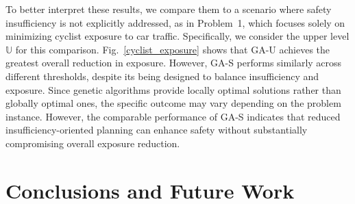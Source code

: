 \documentclass[letterpaper, 10 pt, conference]{ieeeconf}  %
\begin{document}
To better interpret these results, we compare them to a scenario where safety insufficiency is not explicitly addressed, as in Problem~1, which focuses solely on minimizing cyclist exposure to car traffic. Specifically, we consider the upper level $\mathbb{U}$ for this comparison. Fig.~\ref{cyclist_exposure} shows that \mbox{GA-U} achieves the greatest overall reduction in exposure. However, \mbox{GA-S} performs similarly across different thresholds, despite its being designed to balance insufficiency and exposure. Since genetic algorithms provide locally optimal solutions rather than globally optimal ones, the specific outcome may vary depending on the problem instance. However, the comparable performance of \mbox{\mbox{GA-S}} indicates that reduced insufficiency-oriented planning can enhance safety without substantially compromising overall exposure reduction.





\section{Conclusions and Future Work}
\label{conclusions}

\end{document}

